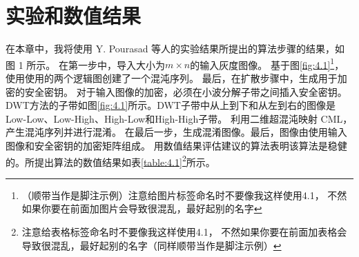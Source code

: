 \chapter{实验和数值结果}

在本章中，我将使用 Y. Pourasad 等人的实验结果所提出的算法步骤的结果，如图 1 所示。
在第一步中，导入大小为$m\times n$的输入灰度图像。
基于图\ref{fig:4.1}\footnote{（顺带当作是脚注示例）注意给图片标签命名时不要像我这样使用4.1，
不然如果你要在前面加图片会导致很混乱，最好起别的名字}，使用使用的两个逻辑图创建了一个混沌序列。
最后，在扩散步骤中，生成用于加密的安全密钥。
对于输入图像的加密，必须在小波分解子带之间插入安全密钥。 
DWT方法的子带如图\ref{fig:4.1}所示。DWT子带中从上到下和从左到右的图像是Low-Low、Low-High、High-Low和High-High子带。
利用二维超混沌映射 CML，产生混沌序列并进行混淆。
在最后一步，生成混淆图像。最后，图像由使用输入图像和安全密钥的加密矩阵组成。
用数值结果评估建议的算法表明该算法是稳健的。所提出算法的数值结果如表\ref{table:4.1}\footnote{
    注意给表格标签命名时不要像我这样使用4.1，
不然如果你要在前面加表格会导致很混乱，最好起别的名字（同样顺带当作是脚注示例）}所示。\\

